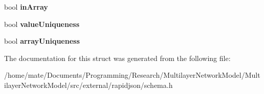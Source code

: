 \begin{DoxyCompactItemize}
\item 
bool {\bfseries in\+Array}\hypertarget{structinternal_1_1SchemaValidationContext_af18fc4ef754e8a52732e152854f06341}{}\label{structinternal_1_1SchemaValidationContext_af18fc4ef754e8a52732e152854f06341}

\item 
bool {\bfseries value\+Uniqueness}\hypertarget{structinternal_1_1SchemaValidationContext_a23e93ca88653ed878e3ddf290fc6bd9f}{}\label{structinternal_1_1SchemaValidationContext_a23e93ca88653ed878e3ddf290fc6bd9f}

\item 
bool {\bfseries array\+Uniqueness}\hypertarget{structinternal_1_1SchemaValidationContext_a0864c5e8155fe0064f17e8dcb31d93c7}{}\label{structinternal_1_1SchemaValidationContext_a0864c5e8155fe0064f17e8dcb31d93c7}

\end{DoxyCompactItemize}


The documentation for this struct was generated from the following file\+:\begin{DoxyCompactItemize}
\item 
/home/mate/\+Documents/\+Programming/\+Research/\+Multilayer\+Network\+Model/\+Multilayer\+Network\+Model/src/external/rapidjson/schema.\+h\end{DoxyCompactItemize}
